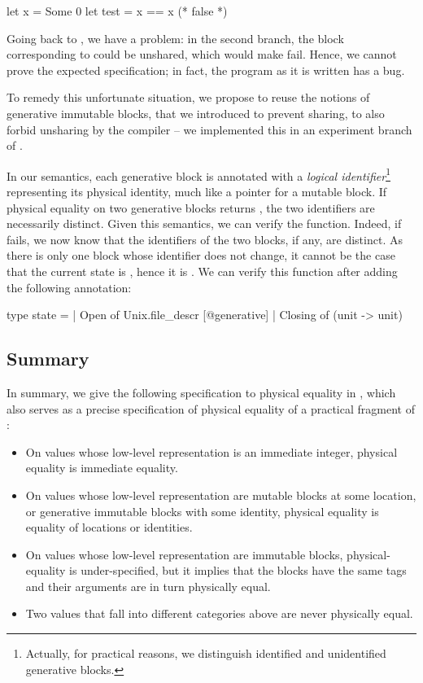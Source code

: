\begin{ocamlcode}
let x = Some 0
let test = x == x (* false *)
\end{ocamlcode}

Going back to , we have a problem: in the second branch, the  block corresponding to  could be unshared, which would make  fail.
Hence, we cannot prove the expected specification; in fact, the program as it is written has a bug.

To remedy this unfortunate situation, we propose to reuse the notions of generative immutable blocks, that we introduced to prevent sharing, to also forbid unsharing by the \OCaml compiler -- we implemented this in an experiment branch of \OCaml.

In our semantics, each generative block is annotated with a \emph{logical identifier}\footnote{Actually, for practical reasons, we distinguish identified and unidentified generative blocks.} representing its physical identity, much like a pointer for a mutable block.
If physical equality on two generative blocks returns , the two identifiers are necessarily distinct.
Given this semantics, we can verify the  function.
Indeed, if  fails, we now know that the identifiers of the two blocks, if any, are distinct.
As there is only one  block whose identifier does not change, it cannot be the case that the current state is , hence it is .
We can verify this function after adding the following annotation:

\begin{ocamlcode}
type state =
  | Open of Unix.file_descr [@generative]
  | Closing of (unit -> unit)
\end{ocamlcode}

\subsection{Summary}

In summary, we give the following specification to physical equality in \ZooLang, which also serves as a precise specification of physical equality of a practical fragment of \OCaml:

\begin{itemize}
\item On values whose low-level representation is
  an immediate integer, physical equality is immediate equality.
\item On values whose low-level representation are
  mutable blocks at some location, or generative immutable blocks with some identity, physical equality is equality of locations or identities.
\item On values whose low-level representation are immutable blocks, physical-equality is under-specified, but it implies that the blocks have the same tags and their arguments are in turn physically equal.
\item Two values that fall into different categories above are never physically equal.
\end{itemize}

